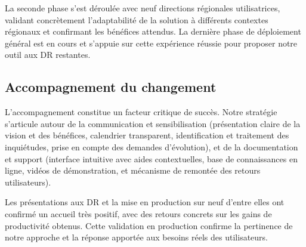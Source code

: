 La seconde phase s'est déroulée avec neuf directions régionales utilisatrices, validant concrètement l'adaptabilité de la solution à différents contextes régionaux et confirmant les bénéfices attendus.
La dernière phase de déploiement général est en cours et s'appuie sur cette expérience réussie pour proposer notre outil aux DR restantes.

\subsection{Accompagnement du changement}
L'accompagnement constitue un facteur critique de succès.
Notre stratégie s'articule autour de la communication et sensibilisation (présentation claire de la vision et des bénéfices, calendrier transparent, identification et traitement des inquiétudes, prise en compte des demandes d'évolution), et de la documentation et support (interface intuitive avec aides contextuelles, base de connaissances en ligne, vidéos de démonstration, et mécanisme de remontée des retours utilisateurs).

Les présentations aux DR et la mise en production sur neuf d'entre elles ont confirmé un accueil très positif, avec des retours concrets sur les gains de productivité obtenus. Cette validation en production confirme la pertinence de notre approche et la réponse apportée aux besoins réels des utilisateurs.

